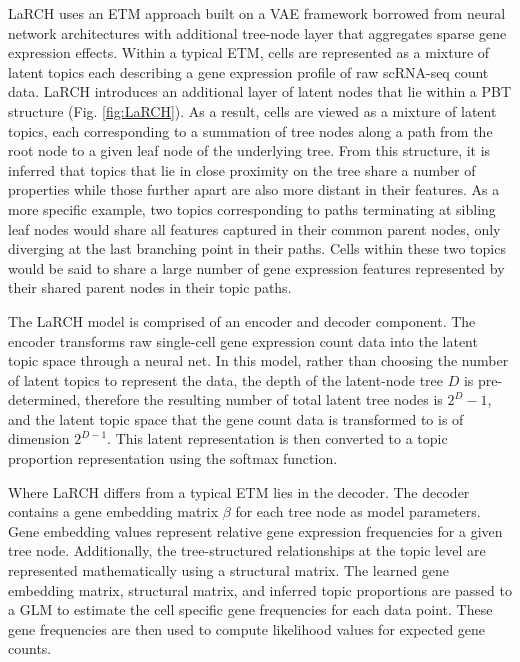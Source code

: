 LaRCH uses an ETM \cite{etm1} approach built on a VAE \cite{Kingma2013-if,Kingma2014-pp,Kingma2015-mo} framework borrowed from neural network architectures with additional tree-node layer that aggregates sparse gene expression effects. Within a typical ETM, cells are represented as a mixture of latent topics each describing a gene expression profile of raw scRNA-seq count data. LaRCH introduces an additional layer of latent nodes that lie within a PBT structure (Fig. \ref{fig:LaRCH}). As a result, cells are viewed as a mixture of latent topics, each corresponding to a summation of tree nodes along a path from the root node to a given leaf node of the underlying tree. From this structure, it is inferred that topics that lie in close proximity on the tree share a number of properties while those further apart are also more distant in their features. As a more specific example, two topics corresponding to paths terminating at sibling leaf nodes would share all features captured in their common parent nodes, only diverging at the last branching point in their paths. Cells within these two topics would be said to share a large number of gene expression features represented by their shared parent nodes in their topic paths. 

The LaRCH model is comprised of an encoder and decoder component. The encoder transforms raw single-cell gene expression count data into the latent topic space through a neural net. In this model, rather than choosing the number of latent topics to represent the data, the depth of the latent-node tree $D$ is pre-determined, therefore the resulting number of total latent tree nodes is $2^D - 1$, and the latent topic space that the gene count data is transformed to is of dimension $2^{D-1}$. This latent representation is then converted to a topic proportion representation using the softmax function. 

Where LaRCH differs from a typical ETM lies in the decoder. The decoder contains a gene embedding matrix $\beta$ for each tree node as model parameters. Gene embedding values represent relative gene expression frequencies for a given tree node. Additionally, the tree-structured relationships at the topic level are represented mathematically using a structural matrix. The learned gene embedding matrix, structural matrix, and inferred topic proportions are passed to a GLM to estimate the cell specific gene frequencies for each data point. These gene frequencies are then used to compute likelihood values for expected gene counts.


